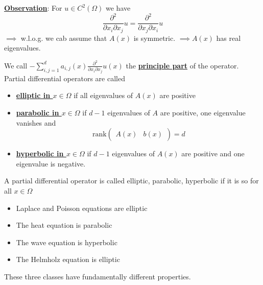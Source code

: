 \underline{\textbf{Observation}}: For $u\in C^2(\Omega)$ we have \[\frac{\partial^2}{\partial x_i\partial x_j}u=\frac{\partial^2}{\partial x_j\partial x_i}u\]
$\implies$ w.l.o.g. we cab assume that $A(x)$ is symmetric.
$\implies A(x)$ has real eigenvalues.

\begin{definition}
We call $-\sum_{i,j=1}^d a_{i,j}(x)\frac{\partial^2}{\partial x_i \partial x_j}u(x)$ the \underline{\textbf{principle part}} of the operator. 
Partial differential operators are called 
\begin{itemize}
    \item \underline{\textbf{elliptic in $x\in\Omega$}} if all eigenvalues of $A(x)$ are positive
    \item \underline{\textbf{parabolic in $x\in \Omega$}} if $d-1$ eigenvalues of $A$ are positive, one eigenvalue vanishes and \[\text{rank}\begin{pmatrix}
         A(x)&  b(x)
    \end{pmatrix}=d\]
    \item \underline{\textbf{hyperbolic in $x\in \Omega$}} if $d-1$ eigenvalues of $A(x)$ are positive and one eigenvalue is negative.
\end{itemize}  
A partial differential operator is called elliptic, parabolic, hyperbolic if it is so for all $x\in \Omega$
\end{definition}

\begin{example}
    \begin{itemize}
        \item Laplace and Poisson equations are elliptic
        \item The heat equation is parabolic
        \item The wave equation is hyperbolic
        \item The Helmholz equation is elliptic
    \end{itemize}
\end{example}


These three classes have fundamentally different properties.


